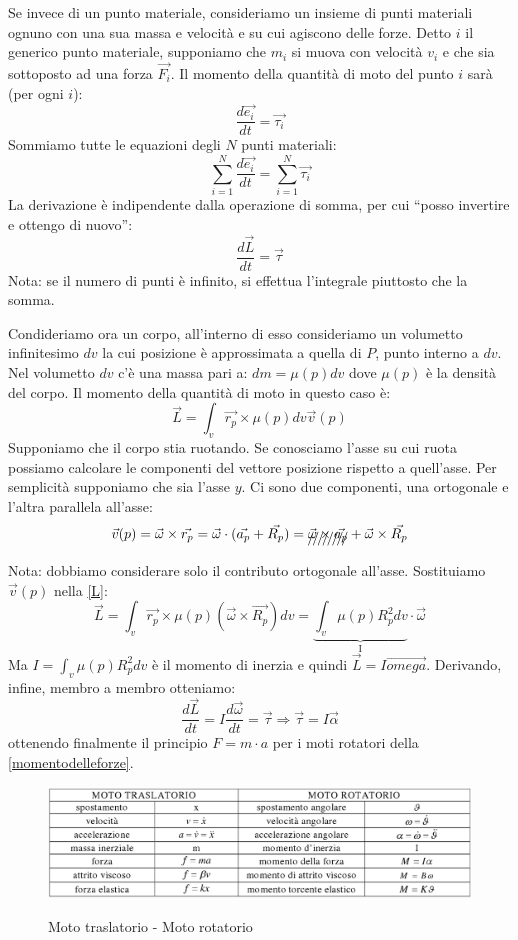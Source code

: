 \documentclass[a4paper]{report}
\begin{document}

Se invece di un punto materiale, consideriamo un insieme di punti
materiali ognuno con una sua massa e velocit\`a e su cui agiscono
delle forze. Detto $i$ il generico punto materiale, supponiamo che
$m_i$ si muova con velocit\`a $v_i$ e che sia sottoposto ad una forza
$\vec{F_i}$. Il momento della quantit\`a di moto del punto $i$ sar\`a
(per ogni $i$):
$$\frac{d \vec{e_i}}{dt} = \vec{\tau_i}$$
Sommiamo tutte le equazioni degli $N$ punti materiali:
$$\sum_{i=1}^{N} \frac{d \vec{e_i}}{dt} = \sum_{i=1}^{N}
\vec{\tau_i}$$
La derivazione \`e indipendente dalla operazione di somma, per cui
``posso invertire e ottengo di nuovo'':
$$\frac{d \vec{L}}{dt} = \vec{\tau}$$
Nota: se il numero di punti \`e infinito, si effettua l'integrale
piuttosto che la somma.

Condideriamo ora un corpo, all'interno di esso consideriamo un
volumetto infinitesimo $dv$ la cui posizione \`e approssimata a quella
di $P$, punto interno a $dv$. Nel volumetto $dv$ c'\`e una massa pari
a: $dm = \mu(p) dv$ dove $\mu(p)$ \`e la densit\`a del corpo. Il
momento della quantit\`a di moto in questo caso \`e:
\begin{equation}\label{L}
\vec{L} = \int_{v} \vec{r_p} \times \mu(p) dv \vec{v}(p)
\end{equation}
Supponiamo che il corpo stia ruotando. Se conosciamo l'asse su cui ruota
possiamo calcolare le componenti del vettore posizione rispetto a
quell'asse. Per semplicit\`a supponiamo che sia l'asse $y$. Ci sono
due componenti, una ortogonale e l'altra parallela all'asse:
$$\vec{v}(p) = \vec{\omega} \times \vec{r_p} = \vec{\omega} \cdot
(\vec{a_p} + \vec{R_p}) = \xout{\vec{\omega} \times \vec{a_p}} +
\vec{\omega} \times \vec{R_p}$$
Nota: dobbiamo considerare solo il contributo ortogonale
all'asse. Sostituiamo $\vec{v}(p)$ nella \ref{L}:
$$\vec{L} = \int_v \vec{r_p} \times \mu(p) (\vec{\omega} \times
\vec{R_p}) dv = \underbrace{\int_v \mu(p) R_p^2 dv}_\text{I} \cdot
\vec{\omega}$$
Ma $I = \int_v \mu(p) R_p^2 dv$ \`e il momento di inerzia e quindi
$\vec{L} = I \vec{omega}$. Derivando, infine, membro a membro
otteniamo:
\begin{equation}
  \frac{d \vec{L}}{dt} = I \frac{d \vec{\omega}}{dt} = \vec{\tau}
  \Rightarrow \vec{\tau} = I \vec{\alpha}
\end{equation}
ottenendo finalmente il principio $F = m \cdot a$ per i moti rotatori
della \ref{momentodelleforze}.
\begin{figure}[!t]
  \centering
  \includegraphics[width=1.0\textwidth]{./images/mototraslatorio-motorotatorio.png}
  \label{fig:mototraslatorio-motorotatorio}
  \caption{Moto traslatorio - Moto rotatorio\label{fig:mototraslatorio-motorotatorio}}
\end{figure}
\end{document}
